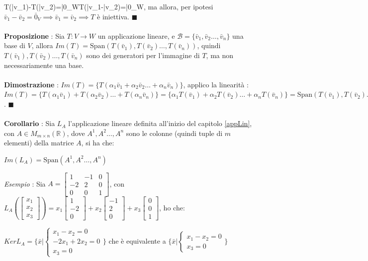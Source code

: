 \documentclass[12pt, letterpaper]{article}
\newcommand{\R}{{\mathbb R}}
\newcommand{\ve}{{\bar v}}
\newcommand{\acc}{\\\hphantom{}\\}
\newcommand{\Span}{{\text{Span}}}
\begin{document}
T(\ve_1)-T(\ve_2)=\bar0_W\iff T(\ve_1-\ve_2)=\bar 0_W\), ma allora, per ipotesi  \(\ve_1-\ve_2=\bar 0_V\implies \ve_1=\ve_2
\implies T\) è iniettiva. \(\blacksquare\)\acc
\textbf{Proposizione} : Sia \(T:V\rightarrow W\) un applicazione lineare, e \(\mathcal{B}=\{\ve_1,\ve_2\dots,\ve_n\}\) una 
base di \(V\), allora \(Im(T)=\Span(T(\ve_1),T(\ve_2)\dots,T(\ve_n))\), quindi \(T(\ve_1),T(\ve_2)\dots,T(\ve_n)\) sono 
dei generatori per l'immagine di \(T\), ma non necessariamente una base.\acc 
\textbf{Dimostrazione} : \(Im(T)=\{T( \alpha_1\ve_1+\alpha_2\ve_2\dots+\alpha_n\ve_n  )\}\), applico la linearità : 
\(Im(T)=\{T( \alpha_1\ve_1)+T(\alpha_2\ve_2)\dots+T(\alpha_n\ve_n  )\}=
\{\alpha_1T( \ve_1)+\alpha_2T(\ve_2)\dots+\alpha_nT(\ve_n  )\}=\Span(T(\ve_1),T(\ve_2)\dots,T(\ve_n))\). \(\blacksquare\)\acc 
\textbf{Corollario} : Sia \(L_A\) l'applicazione lineare definita all'inizio del capitolo \ref{appLin}, con \(A\in M_{m\times n}(\R)\), dove 
\(A^1,A^2\dots,A^n\) sono le colonne (quindi tuple di \(m\) elementi) della matrice \(A\), si ha che:\begin{center}
    \(Im(L_A)=\Span(A^1,A^2\dots,A^n)\)
\end{center}
\textit{Esempio} : Sia \(A=\begin{bmatrix}
    1 &-1&0\\
    -2&2&0\\
    0&0&1
\end{bmatrix}\), con \(L_A(\begin{bmatrix}
    x_1\\x_2\\x_3
\end{bmatrix})=x_1\begin{bmatrix}
    1\\-2\\0
\end{bmatrix}+x_2\begin{bmatrix}
    -1\\2\\0
\end{bmatrix}+x_3\begin{bmatrix}
    0\\0\\1
\end{bmatrix}\), ho che:\begin{center}
    \(KerL_A=\{\bar x | \begin{cases}
    x_1-x_2=0\\-2x_1+2x_2=0\\x_3=0
    \end{cases} \}\) che è equivalente a \(\{\bar x | \begin{cases}
        x_1-x_2=0\\x_3=0
        \end{cases} \}\)
\end{center}
\end{document}

